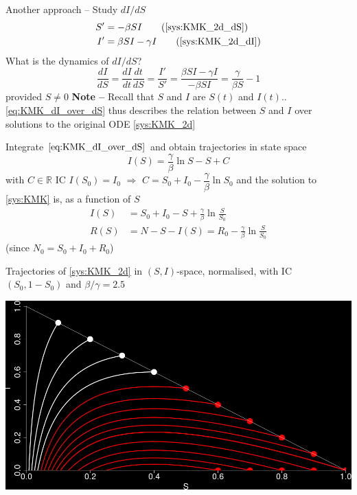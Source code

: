 \documentclass[aspectratio=43]{beamer}
\begin{document}
\begin{frame}{Another approach -- Study $dI/dS$}
  \begin{align}
  S' &= -\beta SI \tag{\ref{sys:KMK_2d_dS}}\\
  I' &= \beta SI-\gamma I  \tag{\ref{sys:KMK_2d_dI}}
  \end{align}
  \vfill
  What is the dynamics of $dI/dS$? 
  \begin{equation}
    \label{eq:KMK_dI_over_dS}
    \frac{dI}{dS}
    =\frac{dI}{dt}\frac{dt}{dS}
    =\frac{I'}{S'}
    =\frac{\beta SI-\gamma I}{-\beta SI}
    =\frac{\gamma}{\beta S}-1
  \end{equation}
 provided $S\neq 0$
  \vfill
  \textbf{Note --} Recall that $S$ and $I$ are $S(t)$ and $I(t)$.. \eqref{eq:KMK_dI_over_dS} thus describes the relation between $S$ and $I$ over solutions to the original ODE \eqref{sys:KMK_2d}
\end{frame}


\begin{frame}{}
  Integrate $\eqref{eq:KMK_dI_over_dS}$ and obtain trajectories in state space
  $$
  I(S)=\frac\gamma\beta \ln S-S+C
  $$
  with $C\in\mathbb{R}$
  \vfill
  IC $I(S_0)=I_0$ $\Rightarrow$ $C=S_0+I_0-\dfrac \gamma\beta \ln S_0$ and the solution to \eqref{sys:KMK} is, as a function of $S$
  \begin{align*}
  I(S)&=S_0+I_0-S+\frac\gamma\beta \ln \frac S{S_0} \\
  R(S)&=N-S-I(S)=R_0-\frac\gamma\beta \ln \frac S{S_0}
  \end{align*}
  (since $N_0=S_0+I_0+R_0$)
\end{frame}


\begin{frame}{}
  Trajectories of \eqref{sys:KMK_2d} in $(S,I)$-space, normalised, with IC $(S_0,1-S_0)$ and $\beta/\gamma=2.5$
  \vfill
\begin{center}
  \includegraphics[width=\textwidth]{../FIGS/KMK_planar_trajectories.png}
\end{center}
\end{frame}
\end{document}
